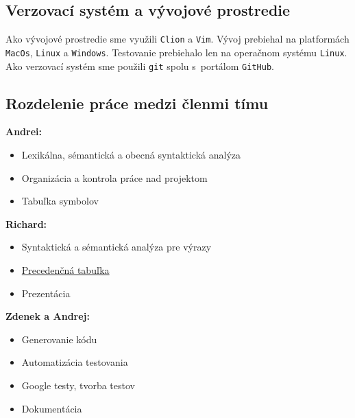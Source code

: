 \documentclass[a4paper, 11pt]{article}
\begin{document}
    \subsection{Verzovací systém a vývojové prostredie}
    Ako vývojové prostredie sme využili \texttt{Clion} a \texttt{Vim}. Vývoj prebiehal na platformách \texttt{MacOs}, \texttt{Linux} a \texttt{Windows}. Testovanie prebiehalo len na operačnom systému \texttt{Linux}. Ako verzovací systém sme použili \texttt{git} spolu s~portálom
    \texttt{GitHub}.
    \newpage
    \subsection{Rozdelenie práce medzi členmi tímu}
    \leavevmode\newline
    \textbf{Andrei:}
    \begin{itemize}
        \item  Lexikálna, sémantická a obecná syntaktická analýza
        \item  Organizácia a kontrola práce nad projektom
        \item  Tabuľka symbolov
    \end{itemize}\leavevmode\newline
    \textbf{Richard:}
    \begin{itemize}
        \item  Syntaktická a sémantická analýza pre výrazy
        \item  \hyperref[sec: prec-tabulka]{Precedenčná tabuľka}
        \item  Prezentácia
    \end{itemize}\leavevmode\newline
    \textbf{Zdenek a Andrej:}
    \begin{itemize}
        \item  Generovanie kódu
        \item  Automatizácia testovania
        \item  Google testy, tvorba testov
        \item  Dokumentácia
    \end{itemize}


\end{document}
